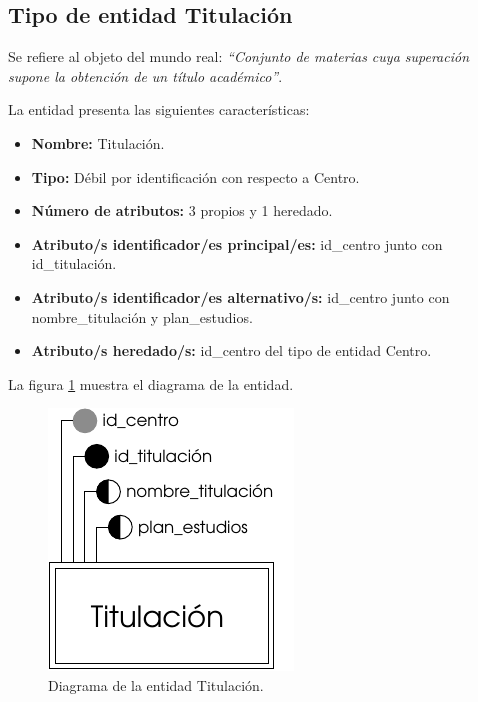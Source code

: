 \subsection{Tipo de entidad Titulación}

   \begin{description}

   \item[Definición] Se refiere al objeto del mundo real: \emph{``Conjunto de
        materias cuya superación supone la obtención de un título académico''}.

   \item[Características] La entidad presenta las siguientes características:
      \begin{itemize}
         \item \textbf{Nombre:} Titulación.
         \item \textbf{Tipo:} Débil por identificación con respecto a Centro.
         \item \textbf{Número de atributos:} 3 propios y 1 heredado.
         \item \textbf{Atributo/s identificador/es principal/es:} id\_centro junto con \\id\_titulación.
         \item \textbf{Atributo/s identificador/es alternativo/s:} id\_centro junto con nombre\_titulación y plan\_estudios.
         \item \textbf{Atributo/s heredado/s:} id\_centro del tipo de entidad Centro.
      \end{itemize}

   \item[Diagrama] La figura \ref{diagramaTitulacion} muestra el diagrama de la entidad.
   \item \begin{figure}[!ht]
            \begin{center}
            \includegraphics[]{07.Modelo_Entidad-Interrelacion/7.2.Analisis_Entidades/diagramas/titulacion.pdf}
            \caption{Diagrama de la entidad Titulación.}
            \label{diagramaTitulacion}
            \end{center}
         \end{figure}


\end{description}
